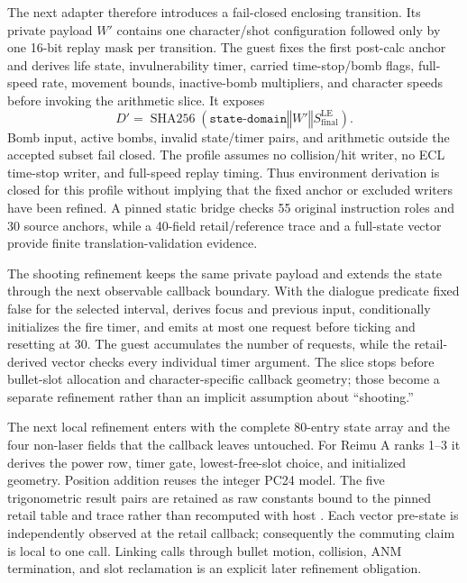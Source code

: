The next adapter therefore introduces a fail-closed enclosing transition.  Its
private payload $W'$ contains one character/shot configuration followed only by
one 16-bit replay mask per transition.  The guest fixes the first post-calc
anchor and derives life state, invulnerability timer, carried time-stop/bomb
flags, full-speed rate, movement bounds, inactive-bomb multipliers, and
character speeds before invoking the arithmetic slice.  It exposes
\[
  D' = \operatorname{SHA256}(\texttt{state-domain}\mathbin\Vert W'
       \mathbin\Vert S_{\mathrm{final}}^{\mathrm{LE}}).
\]
Bomb input, active bombs, invalid state/timer pairs, and arithmetic outside the
accepted subset fail closed.  The profile assumes no collision/hit writer, no
ECL time-stop writer, and full-speed replay timing.  Thus environment derivation
is closed for this profile without implying that the fixed anchor or excluded
writers have been refined.  A pinned static bridge checks 55 original
instruction roles and 30 source anchors, while a 40-field retail/reference
trace and a full-state vector provide finite translation-validation evidence.

The shooting refinement keeps the same private payload and extends the state
through the next observable callback boundary.  With the dialogue predicate
fixed false for the selected interval,  derives focus
and previous input, conditionally initializes the fire timer, and
 emits at most one
 request before ticking and resetting at 30.
The guest accumulates the number of requests, while the retail-derived vector
checks every individual timer argument.  The slice stops before bullet-slot
allocation and character-specific callback geometry; those become a separate
refinement rather than an implicit assumption about ``shooting.''

The next local refinement enters  with the complete
80-entry state array and the four non-laser fields that the callback leaves
untouched.  For Reimu A ranks 1--3 it derives the power row, timer gate,
lowest-free-slot choice, and initialized geometry.  Position addition reuses
the integer PC24 model.  The five trigonometric result pairs are retained as
raw constants bound to the pinned retail table and trace rather than recomputed
with host .  Each vector pre-state is independently observed at the
retail callback; consequently the commuting claim is local to one call.
Linking calls through bullet motion, collision, ANM termination, and slot
reclamation is an explicit later refinement obligation.

